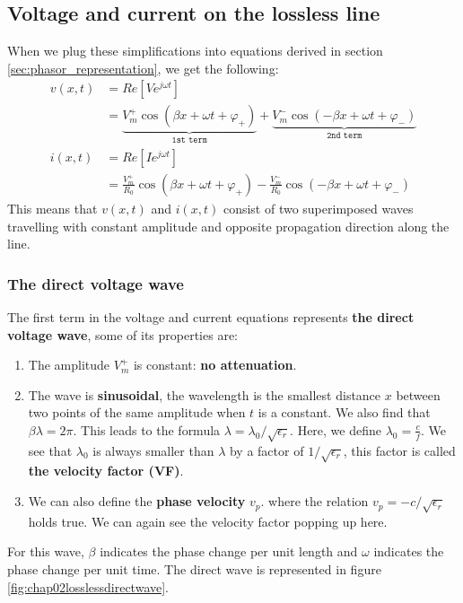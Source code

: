 \documentclass[../transmission.tex]{subfiles}
\begin{document}
		\subsection{Voltage and current on the lossless line}
			\label{sec:volt+curr_lossless_line}
			When we plug these simplifications into equations derived in section \ref{sec:phasor_representation}, we get the following:
			\begin{align}
				v(x,t)&=Re[Ve^{j\omega t}]\\
				&=\underbrace{V^+_m\cos(\beta x+\omega t +\varphi_+)}_{\texttt{1st term}}+\underbrace{V_m^-\cos(-\beta x+\omega t+\varphi_-)}_{\texttt{2nd term}}\\
				i(x,t)&=Re[Ie^{j\omega t}]\\
				&=\frac{V^+_m}{R_0}\cos(\beta x+\omega t +\varphi_+)-\frac{V_m^-}{R_0}\cos(-\beta x+\omega t+\varphi_-)
			\end{align}
			This means that $v(x,t)$ and $i(x,t)$ consist of two superimposed waves travelling with constant amplitude and opposite propagation direction along the line.
			
			\subsubsection{The direct voltage wave}
				The first term in the voltage and current equations represents \textbf{the direct voltage wave}, some of its properties are:
				\begin{enumerate}
					\item The amplitude $V^+_m$ is constant: \textbf{no attenuation}.
					\item The wave is \textbf{sinusoidal}, the wavelength is the smallest distance $x$ between two points of the same amplitude when $t$ is a constant. We also find that $\beta\lambda = 2\pi$. This leads to the formula $\lambda =\lambda_0/\sqrt{\epsilon_r}$. Here, we define $\lambda_0 = \frac{c}{f}$. We see that $\lambda_0$ is always smaller than $\lambda$ by a factor of $1/\sqrt{\epsilon_r}$, this factor is called \textbf{the velocity factor (VF)}.
					\item We can also define the \textbf{phase velocity} $v_p$.  where the relation $v_p=-c/\sqrt{\epsilon_r}$ holds true. We can again see the velocity factor popping up here.
				\end{enumerate}
				For this wave, $\beta$ indicates the phase change per unit length and $\omega$ indicates the phase change per unit time. The direct wave is represented in figure \ref{fig:chap02losslessdirectwave}.
				
\end{document}
